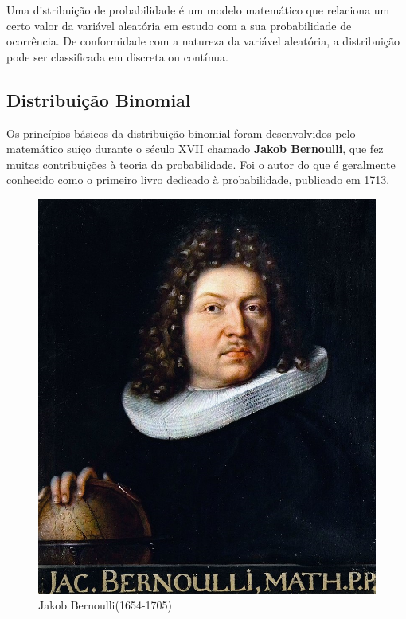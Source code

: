  
\inic Uma distribuição de probabilidade é um modelo matemático que relaciona um certo valor da variável aleatória em estudo com a sua probabilidade de ocorrência. De conformidade com a natureza da variável aleatória, a distribuição pode ser classificada em discreta ou contínua.
 
\subsection{Distribuição Binomial}

Os princípios básicos da distribuição binomial foram desenvolvidos pelo matemático suíço durante o século XVII chamado \textbf{Jakob Bernoulli}, que fez muitas contribuições à teoria da probabilidade. Foi o autor do que é geralmente conhecido como o primeiro livro dedicado à probabilidade, publicado em 1713.

\vspace{-1.68cm}
\begin{figure}
    \centering
\includegraphics[scale=0.2]{figures/Jakob_Bernoulli.jpeg}
    \caption{Jakob Bernoulli(1654-1705)}
    \label{fig:my_label4}
\end{figure}

